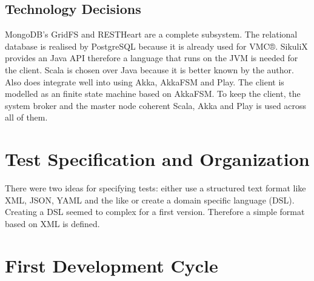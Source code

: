 \documentclass[a4paper,twocolumn]{article}
\newcommand{\VMC}[0]{VMC®}
\begin{document}
\subsection{Technology Decisions}

MongoDB's GridFS and RESTHeart are a complete subsystem.
The relational database is realised by PostgreSQL\cite{PostgreSQL} because it is already used for \VMC{}.
SikuliX provides an Java API therefore a language that runs on the JVM is needed for the client.
Scala is chosen over Java because it is better known by the author.
Also does integrate well into using Akka\cite{Akka}, AkkaFSM\cite{AkkaFSM} and Play\cite{Play}.
The client is modelled as an finite state machine based on AkkaFSM.
To keep the client, the system broker and the master node coherent Scala, Akka and Play is used across all of them.


\section{Test Specification and Organization}
There were two ideas for specifying tests: either use a structured text format like XML, JSON, YAML and the like or create a domain specific language (DSL).
Creating a DSL seemed to complex for a first version.
Therefore a simple format based on XML is defined.


\section{First Development Cycle}



\printbibliography[notkeyword=software]
\printbibliography[keyword=software,title={Used software}]
\end{document}
